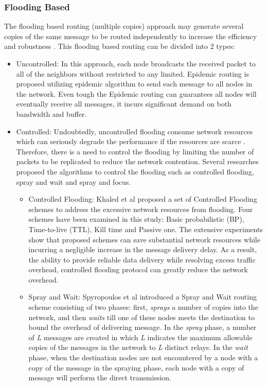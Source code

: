 \subsubsection{Flooding Based}
\label{bg:Opportunistic Networks:Classification of Opportunistic Routing:FB}
The flooding based routing (multiple copies) approach may generate several copies of the same message to be routed independently to increase the efficiency and robustness \cite{Chung-Ming2008}.  
This flooding based routing can be divided into 2 types:
\begin{itemize}
	\item Uncontrolled:
	In this approach, each node broadcasts the received packet to all of the neighbors without restricted to any limited. 
	Epidemic routing \cite{Vahdat2000} is proposed utilizing epidemic algorithm to send each message to all nodes in the network.
	Even tough the Epidemic routing can guarantees all nodes will eventually receive all messages, it incurs significant demand on both bandwidth and buffer.
	\item Controlled:
	Undoubtedly, uncontrolled flooding consume network resources which can seriously degrade the performance if the resources are scarce \cite{Tonguz2006}.
	Therefore, there is a need to control the flooding by limiting the number of packets to be replicated to reduce the network contention.
	Several researches proposed the algorithms to control the flooding such as controlled flooding, spray and wait and spray and focus.
	\begin{itemize}
		
		\item Controlled Flooding: 
		Khaled et al \cite{Khaled2009} proposed a set of Controlled Flooding schemes to address the excessive network resources from flooding. 
		Four schemes have been examined in this study: Basic probabilistic (BP), Time-to-live (TTL), Kill time and Passive one.
		The extensive experiments show that proposed schemes can save substantial network resources while incurring a negligible increase in the message delivery delay.
		As a result, the ability to provide reliable data delivery while resolving excess traffic overhead, controlled flooding protocol can greatly reduce the network overhead.
		
		\item Spray and Wait:
		Spyropoulos et al \cite{Spyropoulos2005} introduced a Spray and Wait routing scheme consisting of two phases: first, \emph{sprays} a number of copies into the network, and then \emph{waits} till one of these nodes meets the destination to bound the overhead of delivering message.
		In the \emph{spray} phase, a number of \emph{L} messages are created in which \emph{L} indicates the maximum allowable copies of the messages in the network to \emph{L} distinct relays.
		In the \emph{wait} phase, when the destination nodes are not encountered by a node with a copy of the message in the spraying phase, each node with a copy of message will perform the direct transmission.
		

\end{itemize}
\end{itemize}
